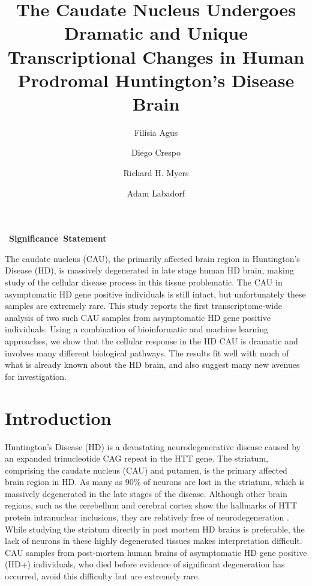 \documentclass[fleqn,10pt,table]{wlscirep}
\author[1,2,3]{Filisia Agus}
\author[1,2]{Diego Crespo}
\author[3]{Richard H. Myers}
\author[1,3,*]{Adam Labadorf}
\affil[1]{Bioinformatics Hub, Boston University, Boston, 02118, USA}
\affil[2]{Bioinformatics Program, Boston University, Boston, 02118, USA}
\affil[3]{Department of Neurology, Boston University School of Medicine, Boston, 02118, USA}
\affil[*]{labadorf@bu.edu}
\title{The Caudate Nucleus Undergoes Dramatic and Unique Transcriptional Changes in Human Prodromal Huntington's Disease Brain}
\begin{document}
\flushbottom
\maketitle

\thispagestyle{empty}

\hbox{
\large
\noindent
\textbf{Significance Statement}
}

\noindent
The caudate nucleus (CAU), the primarily affected brain region in Huntington's Disease (HD), is massively degenerated in late stage human HD brain, making study of the cellular disease process in this tissue problematic.
The CAU in asymptomatic HD gene positive individuals is still intact, but unfortunately these samples are extremely rare.
This study reports the first transcriptome-wide analysis of two such CAU samples from asymptomatic HD gene positive individuals.
Using a combination of bioinformatic and machine learning approaches, we show that the cellular response in the HD CAU is dramatic and involves many different biological pathways.
The results fit well with much of what is already known about the HD brain, and also suggest many new avenues for investigation.


\section{Introduction}
Huntington’s Disease (HD) is a devastating neurodegenerative disease caused by an expanded trinucleotide CAG repeat in the HTT gene.
The striatum, comprising the caudate nucleus (CAU) and putamen, is the primary affected brain region in HD.
As many as 90\% of neurons are lost in the striatum, which is massively degenerated in the late stages of the disease.
Although other brain regions, such as the cerebellum and cerebral cortex show the hallmarks of HTT protein intranuclear inclusions, they are relatively free of neurodegeneration \cite{Sotrel1991-bv,Vonsattel1985-ak}.
While studying the striatum directly in post mortem HD brains is preferable, the lack of neurons in these highly degenerated tissues makes interpretation difficult.
CAU samples from post-mortem human brains of asymptomatic HD gene positive (HD+) individuals, who died before evidence of significant degeneration has occurred, avoid this difficulty but are extremely rare.
\end{document}
